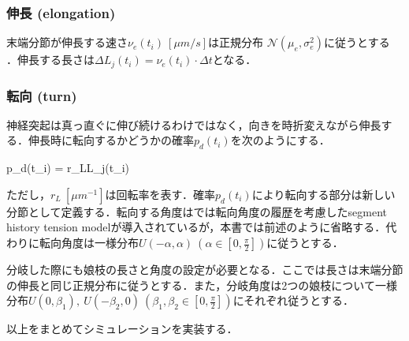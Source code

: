 \subsubsection{伸長 (elongation)}
末端分節が伸長する速さ$\nu_e(t_i)\ [\mu m/s]$は正規分布 $\mathcal{N}(\mu_e, \sigma_e^2)$に従うとする \cite{Van_Ooyen2014-fb}．伸長する長さは$\Delta L_j(t_i)=\nu_e(t_i) \cdot \Delta t$となる．

\subsubsection{転向 (turn)}
神経突起は真っ直ぐに伸び続けるわけではなく，向きを時折変えながら伸長する．伸長時に転向するかどうかの確率$p_d(t_i)$を次のようにする．


p_d(t_i) = r_L\Delta L_j(t_i)


ただし，$r_L\ [\mu m^{-1}]$は回転率を表す．確率$p_d(t_i)$により転向する部分は新しい分節として定義する．転向する角度は\cite{Koene2009-hv}では転向角度の履歴を考慮したsegment history tension modelが導入されているが，本書では前述のように省略する．代わりに転向角度は一様分布$U(-\alpha, \alpha)\ \left(\alpha\in \left[0, \frac{\pi}{2}\right]\right)$に従うとする．

分岐した際にも娘枝の長さと角度の設定が必要となる．ここでは長さは末端分節の伸長と同じ正規分布に従うとする．また，分岐角度は2つの娘枝について一様分布$U(0, \beta_1),\ U(-\beta_2, 0)\ \left(\beta_1, \beta_2\in \left[0, \frac{\pi}{2}\right]\right)$にそれぞれ従うとする．

以上をまとめてシミュレーションを実装する．
